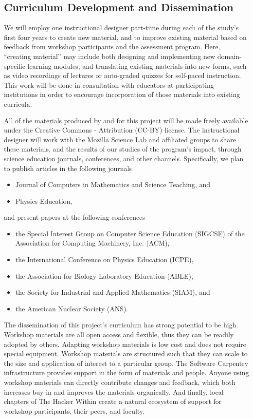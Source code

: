 \documentclass[11pt]{article}
\begin{document}
\subsection{Curriculum Development and Dissemination}

We will employ one instructional designer part-time during each of the
study's first four years to create new material, and to improve
existing material based on feedback from workshop participants and the
assessment program.  Here, ``creating material'' may include both
designing and implementing new domain-specific learning modules, and
translating existing materials into new forms, such as video
recordings of lectures or auto-graded quizzes for self-paced
instruction.  This work will be done in consultation with educators at
participating institutions in order to encourage incorporation of
those materials into existing curricula.

All of the materials produced by and for this project will be made
freely available under the Creative Commons - Attribution (CC-BY)
license.  The instructional designer will work with the Mozilla
Science Lab and affiliated groups to share these materials, and the
results of our studies of the program's impact, through science
education journals, conferences, and other channels. Specifically, we plan to publish articles in the following journals 
\begin{itemize}
\item Journal of Computers in Mathematics and Science Teaching, and
%
\item Physics Education,
\end{itemize}
%
and present papers at the following conferences
\begin{itemize}
\item  the Special Interest Group on Computer Science Education (SIGCSE) of the Association for Computing Machinery, Inc. (ACM),
%
\item the International Conference on Physics Education (ICPE),
%
\item the Association for Biology Laboratory Education (ABLE),
%
\item the Society for Industrial and Applied Mathematics (SIAM), and
%
\item the American Nuclear Society (ANS).
\end{itemize}

The dissemination of this project's curriculum has strong potential to be high. Workshop materials are all open access and flexible, thus they can be readily adopted by others. Adapting workshop materials is low cost and does not require special equipment. Workshop materials are structured such that they can scale to the size and application of interest to a particular group. The Software Carpentry infrastructure provides support in the form of materials and people. Anyone using workshop materials can directly contribute changes and feedback, which both increases buy-in and improves the materials organically. And finally, local chapters of The Hacker Within create a natural ecosystem of support for workshop participants, their peers, and faculty. 
\end{document}
